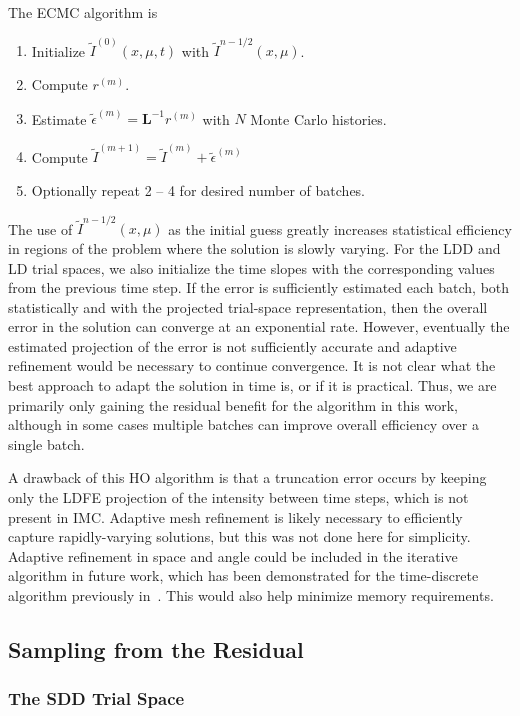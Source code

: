 \documentclass{anstrans}
\newcommand{\B}[1]{\ensuremath{\mathbf{#1}}}
\begin{document}
  The ECMC algorithm is
\begin{enumerate}
    \item Initialize $\tilde I^{(0)}(x,\mu,t)$ with $\tilde I^{n-1/2}(x,\mu)$.
\item Compute $r^{(m)}$.
\item Estimate $\tilde{\epsilon}^{(m)} = \B L^{-1} r^{(m)}$ with $N$ Monte Carlo histories.
\item Compute $\tilde I^{(m+1)} = \tilde I^{(m)}
+ \tilde\epsilon^{(m)}$
\item Optionally repeat 2 -- 4 for desired number of batches.
\end{enumerate}

The use of $\tilde I^{n-1/2}(x,\mu)$ as the initial guess greatly increases statistical efficiency
in regions of the problem where the solution is slowly varying.  For the LDD and LD trial spaces, we also
initialize the time slopes with the corresponding values from the previous time step. If the error is sufficiently
estimated each batch, both statistically and with the projected trial-space representation, then the overall 
error in the solution can converge at an exponential rate.  However, eventually the estimated projection of
the error is not sufficiently accurate  and adaptive refinement would be necessary to continue convergence.  
It is not clear what the best approach to adapt the solution in time is, or if it is practical.   
Thus, we are
primarily only gaining the residual benefit for the algorithm in this work, although in some cases multiple
batches can improve overall efficiency over a single batch.  

A drawback of this HO algorithm is that
a truncation error occurs by keeping only the LDFE projection of the intensity between
time steps, which is not present in IMC.  Adaptive mesh refinement is likely necessary to
efficiently capture rapidly-varying solutions, but this was not done here for simplicity.  
Adaptive refinement in space and angle could be included in the iterative algorithm in future work, which has been
demonstrated for the time-discrete algorithm previously in~\cite{bolding_nse}.  This would also help
minimize memory requirements.

\subsection{Sampling from the Residual}

\subsubsection{The SDD Trial Space}
\end{document}
